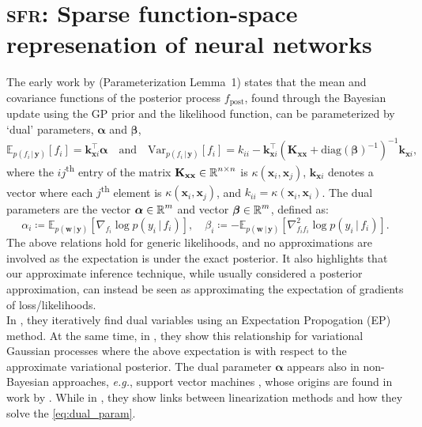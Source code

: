 \documentclass{article}
\makeatletter
\renewcommand{\paragraph}[1]{{\bf #1}~~}
\newcommand{\eg}{\textit{e.g.\@}\xspace}
\newcommand{\our}{\textsc{sfr}\xspace}
\newcommand{\mathbold}[1]{\bm{#1}}
\newcommand{\mbf}[1]{\mathbf{#1}}
\renewcommand{\mid}{\,|\,}
\newcommand{\valpha}[0]{\mathbold{\alpha}}
\newcommand{\vbeta}[0]{\mathbold{\beta}}
\newcommand{\diag}{\text{{diag}}}
\newcommand{\vx}{\mbf{x}}
\newcommand{\vy}{\mbf{y}}
\newcommand{\vw}{\mbf{w}}
\newcommand{\MKxx}{\mbf{K}_{\mbf{x}\mbf{x}}}
\newcommand{\vk}{\mbf{k}}
\newcommand{\myexpect}{\mathbb{E}}
\makeatother
\begin{document}
\section{\our: Sparse function-space represenation of neural networks}
The early work by \citet{csato2002sparse} (Parameterization Lemma~1) states that the mean and covariance functions of the posterior process $f_{\textrm{post}}$, found through the Bayesian update using the GP prior and the likelihood function, can be parameterized by `dual' parameters, $\valpha$ and $\vbeta$,
%
\begin{equation}  \label{eq:gp_pred}
  \myexpect_{p(f_i \mid\vy)}[f_i]= \vk_{\vx i}^\top \valpha \quad \text{and} \quad
  \mathrm{Var}_{p(f_i \mid \vy)}[f_i] = k_{ii} - \vk_{\vx i}^\top ( \MKxx + \diag(\vbeta)^{-1})^{-1} \vk_{\vx i},
\end{equation}
%
where the $ij$\textsuperscript{th} entry of the matrix $\MKxx \in \R^{n \times n}$ is $\kappa(\vx_i,\vx_j)$, $\vk_{\vx i}$ denotes a vector where each $j$\textsuperscript{th} element is $\kappa(\vx_i, \vx_j)$, and $k_{ii} = \kappa(\vx_i, \vx_i)$.  The dual parameters are the vector $\valpha \in \R^{m}$ and vector $\vbeta \in \R^{m}$, defined as:
\begin{equation}
\label{eq:dual_param}
\alpha_i \coloneqq \myexpect_{p(\vw \mid \vy)}[\nabla_{f_i}\log p(y_i \mid f_i)],  \quad
\beta_i \coloneqq - \myexpect_{p(\vw \mid \vy)}[\nabla^2_{f_i f_i}\log p(y_i \mid f_i)] .
\end{equation}
%
The above relations hold for generic likelihoods, and no approximations are involved as the expectation is under the exact posterior. 
It also highlights that our approximate inference technique, while usually considered a posterior approximation, can instead be seen as approximating the expectation of gradients of loss/likelihoods. \\
In \citet{csato2002sparse}, they iteratively find dual variables using an Expectation Propogation (EP) method.  
At the same time, in \cite{adam2021dual, chang2020fast}, they show this relationship for variational Gaussian processes where the above expectation is with respect to the approximate variational posterior. The dual parameter $\valpha$ appears also in non-Bayesian approaches, \eg, support vector machines \citep{cortes1995support}, whose origins are found in work by \citet{kimeldorf1971some}. While in \citet{wilkinson2023bayes}, they show links between linearization methods and how they solve the \cref{eq:dual_param}.
\end{document}
